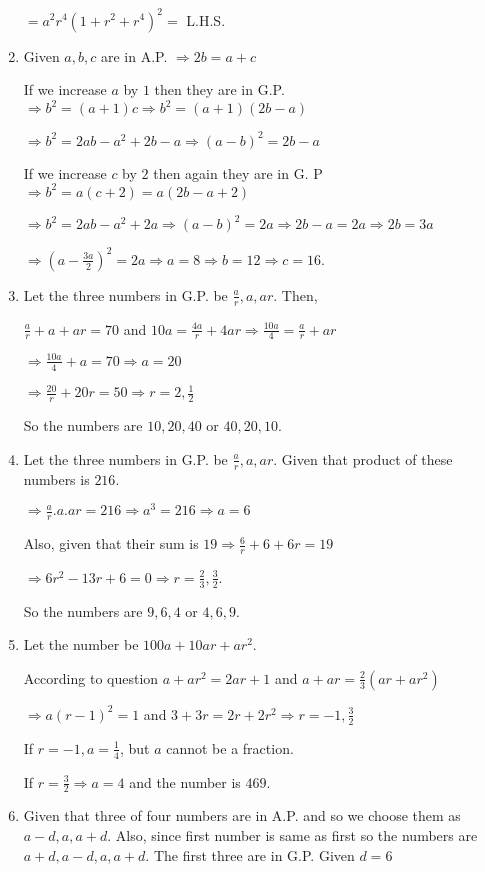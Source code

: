 \begin{enumerate}
  $= a^2r^4(1 + r^2 + r^4)^2 =$ L.H.S.
\item Given $a, b, c$ are in A.P. $\Rightarrow 2b = a + c$

  If we increase $a$ by $1$ then they are in G.P. $\Rightarrow b^2 = (a + 1)c \Rightarrow b^2 = (a + 1)(2b - a)$

  $\Rightarrow b^2 = 2ab - a^2 + 2b - a \Rightarrow (a - b)^2 = 2b - a$

  If we increase $c$ by $2$ then again they are in G. P $\Rightarrow b^2 = a(c + 2) = a(2b - a + 2)$

  $\Rightarrow b^2 = 2ab - a^2 + 2a \Rightarrow (a - b)^2 = 2a \Rightarrow 2b - a = 2a \Rightarrow 2b = 3a$

  $\Rightarrow \left(a - \frac{3a}{2}\right)^2 = 2a \Rightarrow a = 8 \Rightarrow b = 12 \Rightarrow c = 16$.
\item Let the three numbers in G.P. be $\frac{a}{r}, a, ar$. Then,

  $\frac{a}{r} + a + ar = 70$ and $10a = \frac{4a}{r} + 4ar \Rightarrow \frac{10a}{4} = \frac{a}{r} + ar$

  $\Rightarrow \frac{10a}{4} + a = 70 \Rightarrow a = 20$

  $\Rightarrow \frac{20}{r} + 20r = 50 \Rightarrow r = 2, \frac{1}{2}$

  So the numbers are $10, 20, 40$ or $40, 20, 10$.
\item Let the three numbers in G.P. be $\frac{a}{r}, a, ar$. Given that product of these numbers is $216$.

  $\Rightarrow \frac{a}{r}.a.ar = 216 \Rightarrow a^3 = 216 \Rightarrow a = 6$

  Also, given that their sum is $19 \Rightarrow \frac{6}{r} + 6 + 6r = 19$

  $\Rightarrow 6r^2 - 13r + 6 = 0 \Rightarrow r = \frac{2}{3}, \frac{3}{2}$.

  So the numbers are $9, 6, 4$ or $4, 6, 9$.
\item Let the number be $100a + 10ar + ar^2$.

  According to question $a + ar^2 = 2ar + 1$ and $a + ar = \frac{2}{3}(ar + ar^2)$

  $\Rightarrow a(r - 1)^2 = 1$ and $3 + 3r = 2r + 2r^2 \Rightarrow r = -1, \frac{3}{2}$

  If $r = -1, a = \frac{1}{4}$, but $a$ cannot be a fraction.

  If $r = \frac{3}{2} \Rightarrow a = 4$ and the number is $469$.
\item Given that three of four numbers are in A.P. and so we choose them as $a - d, a, a + d$. Also, since first number is same as
  first so the numbers are $a + d, a - d, a, a + d$. The first three are in G.P. Given $d = 6$


\end{enumerate}
